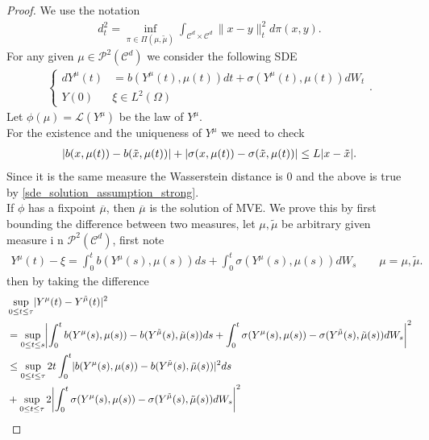\begin{proof}
 We use the notation 
 \begin{align*}
   d_t^2 =  \inf_{\pi  \in  \Pi(\mu,\tilde{\mu } )} \int_{\mathcal{C}^{d} \times  \mathcal{C}^{d}  }\|x-y\|^2_t d\pi(x,y)
 .\end{align*}
 For any given $\mu  \in \mathcal{P}^2(\mathcal{C}^{d} )$ we consider the following SDE 
 \begin{align*}
   \begin{cases} 
   dY^{\mu } (t) &= b(Y^{\mu} (t),\mu(t))dt + \sigma(Y^{\mu } (t),\mu(t))dW_t\\
    Y(0)   & \xi \in  L^2(\Omega)
   \end{cases}
 .\end{align*}
 Let $\phi(\mu ) = \mathcal{L}(Y^{\mu } ) $ be the law of $Y^{\mu} $. \\[1ex]
 For the existence  and the uniqueness of $Y^{\mu } $ we need to check 
 \begin{align*}
   \lvert b(x,\mu(t)) - b(\tilde{x},\mu(t) )\rvert + \lvert\sigma(x,\mu(t)) - \sigma(\tilde{x},\mu(t))\rvert \le  L \lvert x-\tilde{x} \rvert
 .\end{align*}
 Since it is the same measure the Wasserstein distance is 0 and the above is true by \autoref{sde_solution_assumption_strong}.\\
 If $\phi $ has a fixpoint $\overline{\mu } $, then $\overline{\mu } $ is the solution of MVE.
 We prove this by first bounding the difference between two measures, let $\mu ,\tilde{\mu }$ be arbitrary given measure i n
 $\mathcal{P}^2(\mathcal{C}^{d} )$, first note
 \begin{align*}
  Y^{\mu }(t) - \xi = \int_0^{t} b(Y^{\mu }(s),\mu(s) ) ds + \int_0^{t} \sigma(Y^{\mu }(s),\mu(s) ) dW_s \qquad \mu= \mu,\tilde{\mu} 
 .\end{align*}
 then by taking the difference 
 \begin{align*}
   &\sup_{0\le t \le \tau }\abs{Y^{\mu }(t) - Y^{\tilde{\mu } }(t)}^2 \\
   &= \sup_{0\le t \le s}\abs*{\int_0^{t} b(Y^{\mu }(s),\mu(s) )- b(Y^{\tilde{\mu}}(s),\tilde{\mu}(s) ) ds + \int_0^{t} \sigma(Y^{\mu }(s),\mu(s) ) - \sigma (Y^{\tilde{\mu}}(s),\tilde{\mu}(s) ) dW_s}^2\\
   &\le \sup_{0\le t \le \tau } 2t \int_0^{t} \abs{b(Y^{\mu }(s),\mu(s) )- b(Y^{\tilde{\mu}}(s),\tilde{\mu}(s) )}^2 ds \\
   &+ \sup_{0\le t \le \tau }2 \abs*{\int_0^{t} \sigma(Y^{\mu }(s),\mu(s) ) - \sigma (Y^{\tilde{\mu}}(s),\tilde{\mu}(s) ) dW_s}^2 \\

\end{align*}
\end{proof}
